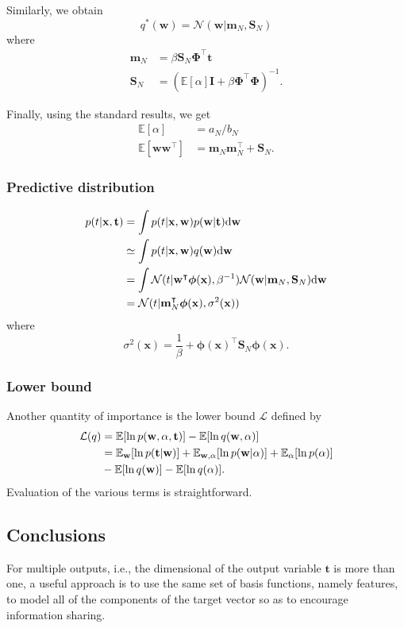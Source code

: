 \documentclass[a4paper]{book}
\newcommand{\ud}{\mathrm{d}}
\renewcommand{\bf}{\mathbf}
\renewcommand{\cal}{\mathcal}
\newcommand{\bb}{\mathbb}
\newcommand{\bs}{\boldsymbol}
\begin{document}
Similarly, we obtain
\begin{equation}
	q^*(\bf{w}) = \cal{N}(\bf{w}|\bf{m}_N,\bf{S}_N)
\end{equation}
where
\begin{align}
	\bf{m}_N &= \beta \bf{S}_N \bs{\Phi}^{\intercal} \bf{t} \\
	\bf{S}_N &= (\bb{E}[\alpha]\bf{I} + \beta \bs{\Phi}^{\intercal} \bs{\Phi})^{-1}.
\end{align}

Finally, using the standard results, we get
\begin{align}
	\bb{E}[\alpha] &= a_N/b_N \\
	\bb{E}[\bf{w}\bf{w}^{\intercal}] &= \bf{m}_N \bf{m}_N^{\intercal} + \bs{S}_N.
\end{align}
\subsubsection{Predictive distribution}
\begin{align}
	p(t|\bf{x,t}) &= \int p(t|\bf{x,w})p(\bf{w|t}) \ud \bf{w} \notag \\
	&\simeq \int p(t|\bf{x,w})q(\bf{w}) \ud \bf{w} \notag\\
	&= \int \cal{N}(t|\bf{w}^{\intercal} \bs{\phi}(\bf{x}),\beta^{-1})\cal{N}(\bf{w}|\bf{m}_N,\bf{S}_N) \ud \bf{w} \notag \\
	&= \cal{N}(t|\bf{m}_N^{\intercal} \bs{\phi}(\bf{x}),\sigma^2(\bf{x}))
\end{align}
where
\begin{equation}
	\sigma^2(\bf{x}) = \frac{1}{\beta} + \bs{\phi}(\bf{x})^{\intercal} \bf{S}_N \bs{\phi}(\bf{x}).
\end{equation}
\subsubsection{Lower bound}
Another quantity of importance is the lower bound $\cal{L}$ defined by
\begin{align}
	\cal{L}(q) &= \bb{E}[\ln p(\bf{w},\alpha,\bf{t})]-\bb{E}[\ln q(\bf{w},\alpha)] \notag\\
	&= \bb{E}_{\bf{w}}[\ln p(\bf{t|w})] + \bb{E}_{\bf{w},\alpha}[\ln p(\bf{w}|\alpha)]+\bb{E}_{\alpha}[\ln p(\alpha)]\notag\\
	&-\bb{E}[\ln q(\bf{w})]-\bb{E}[\ln q(\alpha)].	
\end{align}
Evaluation of the various terms is straightforward.


\subsection{Conclusions}
For multiple outputs, i.e., the dimensional of the output variable $\bf{t}$ is more than one, a useful approach is to use the same set of basis functions, namely features, to model all of the components of the target vector so as to encourage information sharing.
\end{document}
